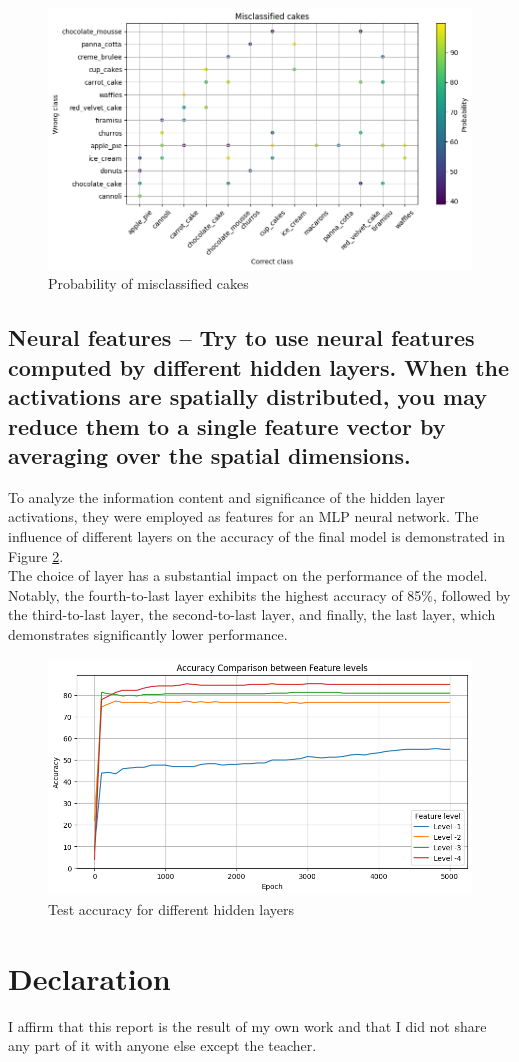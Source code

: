 \documentclass{class}
\begin{document}
\begin{figure}[h!]
    \centering
    \includegraphics[width=.9\columnwidth]{images/2.2_probability_of_misclassified.png}
    \caption{Probability of misclassified cakes}
    \label{fig-6}
\end{figure}

\subsection{Neural features -- Try to use neural features computed by different hidden layers. When the activations
    are spatially distributed, you may reduce them to a single feature vector by averaging
    over the spatial dimensions.}
To analyze the information content and significance of the hidden layer activations, they were employed as features for an MLP neural network.
The influence of different layers on the accuracy of the final model is demonstrated in Figure \ref{fig-7}.\\
The choice of layer has a substantial impact on the performance of the model.
Notably, the fourth-to-last layer exhibits the highest accuracy of 85\%, followed by the third-to-last layer, the second-to-last layer,
and finally, the last layer, which demonstrates significantly lower performance.\\
\begin{figure}[h]
    \centering
    \includegraphics[width=.9\columnwidth]{images/2.3_diff_levels.png}
    \caption{Test accuracy for different hidden layers}
    \label{fig-7}
\end{figure}

\section{Declaration}
I affirm that this report is the result of my own work and that I did not share any part of it with anyone
else except the teacher.
\end{document}
